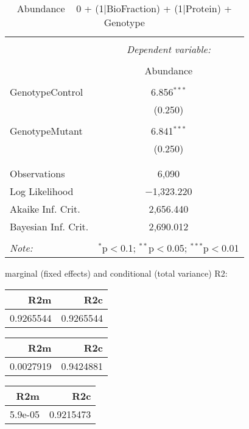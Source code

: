 \documentclass[11pt]{report}
\begin{document}
\begin{table}[!htbp] \centering 
  \caption{Abundance ~ 0 + (1|BioFraction) + (1|Protein) + Genotype} 
  \label{} 
\begin{tabular}{@{\extracolsep{5pt}}lc} 
\\[-1.8ex]\hline 
\hline \\[-1.8ex] 
 & \multicolumn{1}{c}{\textit{Dependent variable:}} \\ 
\cline{2-2} 
\\[-1.8ex] & Abundance \\ 
\hline \\[-1.8ex] 
 GenotypeControl & 6.856$^{***}$ \\ 
  & (0.250) \\ 
  & \\ 
 GenotypeMutant & 6.841$^{***}$ \\ 
  & (0.250) \\ 
  & \\ 
\hline \\[-1.8ex] 
Observations & 6,090 \\ 
Log Likelihood & $-$1,323.220 \\ 
Akaike Inf. Crit. & 2,656.440 \\ 
Bayesian Inf. Crit. & 2,690.012 \\ 
\hline 
\hline \\[-1.8ex] 
\textit{Note:}  & \multicolumn{1}{r}{$^{*}$p$<$0.1; $^{**}$p$<$0.05; $^{***}$p$<$0.01} \\ 
\end{tabular} 
\end{table} 
marginal (fixed effects) and conditional (total variance) R2:

\begin{tabular}{r|r}
\hline
R2m & R2c\\
\hline
0.9265544 & 0.9265544\\
\hline
\end{tabular}

\begin{tabular}{r|r}
\hline
R2m & R2c\\
\hline
0.0027919 & 0.9424881\\
\hline
\end{tabular}

\begin{tabular}{r|r}
\hline
R2m & R2c\\
\hline
5.9e-05 & 0.9215473\\
\hline
\end{tabular}
\end{document}
